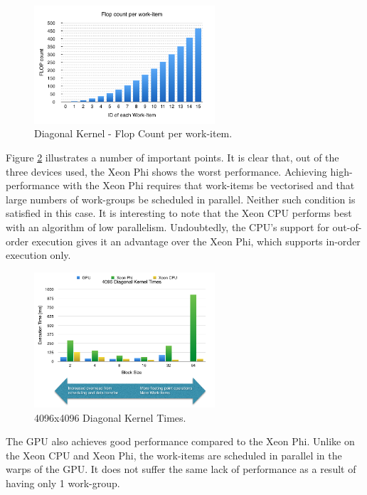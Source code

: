 \begin{figure}[!h]
    \centering
    \includegraphics[width=0.6\textwidth]{figures/FlopCount.png}
    \caption{Diagonal Kernel - Flop Count per work-item.}
    \label{FlopCount}
\end{figure}

\par{Figure \ref{DiagonalKernel} illustrates a number of important points. It is clear that, 
    out of the three devices used, the Xeon Phi shows the worst performance. 
    Achieving high-performance with the Xeon Phi requires that work-items be vectorised and 
    that large numbers of work-groups be scheduled in parallel. Neither such condition is satisfied in this case. 
    It is interesting to note that the Xeon CPU performs best with an algorithm of low parallelism. 
    Undoubtedly, the CPU’s support for out-of-order execution gives it an advantage over the Xeon Phi, 
    which supports in-order execution only.}

\begin{figure}[!h]
    \centering
    \includegraphics[width=0.6\textwidth]{figures/DiagonalKernel.png}
    \caption{4096x4096 Diagonal Kernel Times.}
    \label{DiagonalKernel}
\end{figure}

\par{The GPU also achieves good performance compared to the Xeon Phi. Unlike on the Xeon CPU and Xeon Phi, 
    the work-items are scheduled in parallel in the warps of the GPU. It does not suffer the same lack of 
    performance as a result of having only 1 work-group.}



